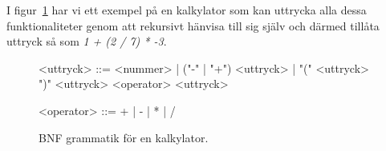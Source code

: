 I figur~\ref{fig:cfg} har vi ett exempel på en kalkylator som kan uttrycka
alla dessa funktionaliteter genom att rekursivt hänvisa till sig själv och
därmed tillåta uttryck så som \textit{1 + (2 / 7) * -3}.

\begin{figure}[ht]
  \begin{grammar}
    \singlespace\small%
    \selectfont

    <uttryck> ::= <nummer> | ("-" | "+") <uttryck> | "(" <uttryck> ")"
      \alt <uttryck> <operator> <uttryck>

    <operator> ::= + | - | * | /

  \end{grammar}
  \caption{BNF grammatik för en kalkylator.}
  \label{fig:cfg}
\end{figure}

